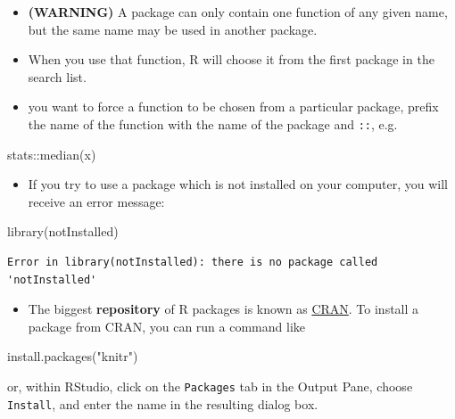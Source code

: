 \documentclass[
  9pt,
  a4paper,
  ignorenonframetext,
  notheorems]{beamer}
\newenvironment{Shaded}{\begin{snugshade}}{\end{snugshade}}
\newcommand{\FunctionTok}[1]{\textcolor[rgb]{0.28,0.35,0.67}{#1}}
\newcommand{\NormalTok}[1]{\textcolor[rgb]{0.00,0.23,0.31}{#1}}
\newcommand{\SpecialCharTok}[1]{\textcolor[rgb]{0.37,0.37,0.37}{#1}}
\newcommand{\StringTok}[1]{\textcolor[rgb]{0.13,0.47,0.30}{#1}}
\providecommand{\tightlist}{%
  \setlength{\itemsep}{0pt}\setlength{\parskip}{0pt}}\usepackage{longtable,booktabs,array}
\begin{document}
\begin{frame}[fragile]
\begin{itemize}
\item
  \textbf{(WARNING)} A package can only contain one function of any
  given name, but the same name may be used in another package.
\item
  When you use that function, R will choose it from the first package in
  the search list.
\item
  you want to force a function to be chosen from a particular package,
  prefix the name of the function with the name of the package and
  \texttt{::}, e.g.
\end{itemize}

\begin{Shaded}
\begin{Highlighting}[]
\NormalTok{stats}\SpecialCharTok{::}\FunctionTok{median}\NormalTok{(x)}
\end{Highlighting}
\end{Shaded}

\begin{itemize}
\tightlist
\item
  If you try to use a package which is not installed on your computer,
  you will receive an error message:
\end{itemize}

\begin{Shaded}
\begin{Highlighting}[]
\FunctionTok{library}\NormalTok{(notInstalled)}
\end{Highlighting}
\end{Shaded}

\begin{verbatim}
Error in library(notInstalled): there is no package called 'notInstalled'
\end{verbatim}

\begin{itemize}
\tightlist
\item
  The biggest \textbf{repository} of R packages is known as
  \href{https://cran.r-project.orghttps://cran.r-project.org}{CRAN}. To
  install a package from CRAN, you can run a command like
\end{itemize}

\begin{Shaded}
\begin{Highlighting}[]
\FunctionTok{install.packages}\NormalTok{(}\StringTok{"knitr"}\NormalTok{)}
\end{Highlighting}
\end{Shaded}

or, within RStudio, click on the \texttt{Packages} tab in the Output
Pane, choose \texttt{Install}, and enter the name in the resulting
dialog box.
\end{frame}
\end{document}
